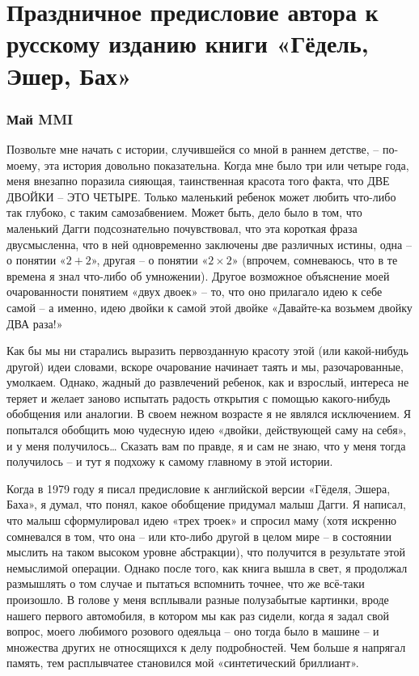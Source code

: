 \documentclass[../main.tex]{subfiles}
\begin{document}

\chapter[Предисловие]{Праздничное предисловие автора к русскому изданию книги «Гёдель, Эшер, Бах»}

\subsection{Май MMI}

Позвольте мне начать с истории, случившейся со мной в раннем детстве, \--- по-моему, эта история довольно показательна. Когда мне было три или четыре года, меня внезапно поразила сияющая, таинственная красота того факта, что ДВЕ ДВОЙКИ \--- ЭТО ЧЕТЫРЕ\@. Только маленький ребенок может любить что-либо так глубоко, с таким самозабвением. Может быть, дело было в том, что маленький Дагги подсознательно почувствовал, что эта короткая фраза двусмысленна, что в ней одновременно заключены две различных истины, одна \--- о понятии «$2 + 2$», другая \--- о понятии «$2 \times 2$» (впрочем, сомневаюсь, что в те времена я знал что-либо об умножении). Другое возможное объяснение моей очарованности понятием «двух двоек» \--- то, что оно прилагало идею к себе самой \--- а именно, идею двойки к самой этой двойке «Давайте-ка возьмем двойку ДВА раза!»

Как бы мы ни старались выразить первозданную красоту этой (или какой-нибудь другой) идеи словами, вскоре очарование начинает таять и мы, разочарованные, умолкаем. Однако, жадный до развлечений ребенок, как и взрослый, интереса не теряет и желает заново испытать радость открытия с помощью какого-нибудь обобщения или аналогии. В своем нежном возрасте я не являлся исключением. Я попытался обобщить мою чудесную идею «двойки, действующей саму на себя», и у меня получилось\ldots{} Сказать вам по правде, я и сам не знаю, что у меня тогда получилось \--- и тут я подхожу к самому главному в этой истории.

Когда в 1979 году я писал предисловие к английской версии «Гёделя, Эшера, Баха», я думал, что понял, какое обобщение придумал малыш Дагги. Я написал, что малыш сформулировал идею «трех троек» и спросил маму (хотя искренно сомневался в том, что она \--- или кто-либо другой в целом мире \--- в состоянии мыслить на таком высоком уровне абстракции), что получится в результате этой немыслимой операции. Однако после того, как книга вышла в свет, я продолжал размышлять о том случае и пытаться вспомнить точнее, что же всё-таки произошло. В голове у меня всплывали разные полузабытые картинки, вроде нашего первого автомобиля, в котором мы как раз сидели, когда я задал свой вопрос, моего любимого розового одеяльца \--- оно тогда было в машине \--- и множества других не относящихся к делу подробностей. Чем больше я напрягал память, тем расплывчатее становился мой «синтетический бриллиант».
\end{document}
